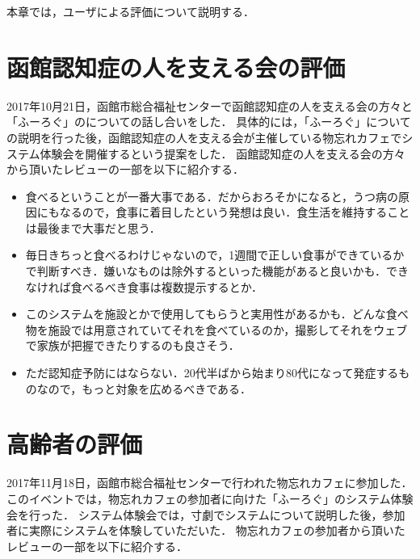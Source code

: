 \documentclass[../report]{subfiles}
\begin{document}
本章では，ユーザによる評価について説明する．

\section{函館認知症の人を支える会の評価} \label{sec:7_hyouka_monowasurecafe}
2017年10月21日，函館市総合福祉センターで函館認知症の人を支える会の方々と「ふーろぐ」のについての話し合いをした．
具体的には，「ふーろぐ」についての説明を行った後，函館認知症の人を支える会が主催している物忘れカフェでシステム体験会を開催するという提案をした．
函館認知症の人を支える会の方々から頂いたレビューの一部を以下に紹介する．

\begin{itemize}
    \item 食べるということが一番大事である．だからおろそかになると，うつ病の原因にもなるので，食事に着目したという発想は良い．食生活を維持することは最後まで大事だと思う．
    \item 毎日きちっと食べるわけじゃないので，1週間で正しい食事ができているかで判断すべき．嫌いなものは除外するといった機能があると良いかも．できなければ食べるべき食事は複数提示するとか．
    \item このシステムを施設とかで使用してもらうと実用性があるかも．どんな食べ物を施設では用意されていてそれを食べているのか，撮影してそれをウェブで家族が把握できたりするのも良さそう．
    \item ただ認知症予防にはならない．20代半ばから始まり80代になって発症するものなので，もっと対象を広めるべきである．
\end{itemize}

\section{高齢者の評価} \label{sec:7_hyouka_system}
2017年11月18日，函館市総合福祉センターで行われた物忘れカフェに参加した．
このイベントでは，物忘れカフェの参加者に向けた「ふーろぐ」のシステム体験会を行った．
システム体験会では，寸劇でシステムについて説明した後，参加者に実際にシステムを体験していただいた．
物忘れカフェの参加者から頂いたレビューの一部を以下に紹介する．
\end{document}
